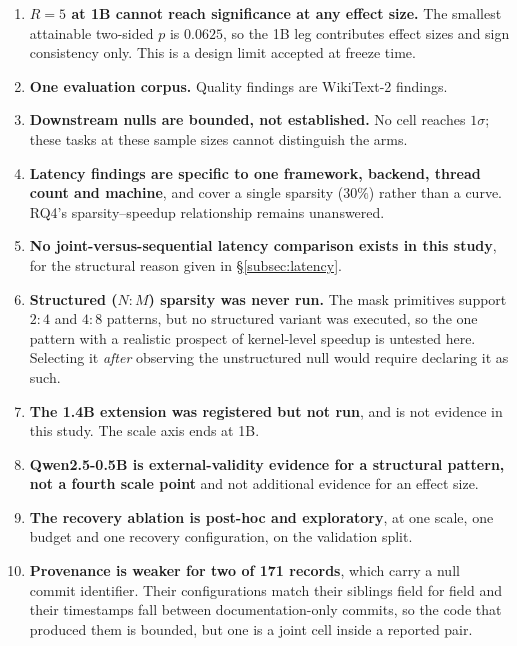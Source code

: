 \begin{enumerate}
        by up to the order margin measured on validation ($\sim\!\SI{0.18}{pp}$ at 160M/W8),
        which exceeds the W8 gains themselves. No W8 conclusion should rest on sign alone.
  \item \textbf{$R = 5$ at 1B cannot reach significance at any effect size.} The smallest
        attainable two-sided $p$ is $0.0625$, so the 1B leg contributes effect sizes and sign
        consistency only. This is a design limit accepted at freeze time.
  \item \textbf{One evaluation corpus.} Quality findings are WikiText-2 findings.
  \item \textbf{Downstream nulls are bounded, not established.} No cell reaches $1\sigma$;
        these tasks at these sample sizes cannot distinguish the arms.
  \item \textbf{Latency findings are specific to one framework, backend, thread count and
        machine}, and cover a single sparsity ($30\%$) rather than a curve. RQ4's
        sparsity--speedup relationship remains unanswered.
  \item \textbf{No joint-versus-sequential latency comparison exists in this study}, for the
        structural reason given in \S\ref{subsec:latency}.
  \item \textbf{Structured ($N{:}M$) sparsity was never run.} The mask primitives support
        $2{:}4$ and $4{:}8$ patterns, but no structured variant was executed, so the one
        pattern with a realistic prospect of kernel-level speedup is untested here. Selecting
        it \emph{after} observing the unstructured null would require declaring it as such.
  \item \textbf{The 1.4B extension was registered but not run}, and is not evidence in this
        study. The scale axis ends at 1B.
  \item \textbf{Qwen2.5-0.5B is external-validity evidence for a structural pattern, not a
        fourth scale point} and not additional evidence for an effect size.
  \item \textbf{The recovery ablation is post-hoc and exploratory}, at one scale, one budget
        and one recovery configuration, on the validation split.
  \item \textbf{Provenance is weaker for two of 171 records}, which carry a null commit
        identifier. Their configurations match their siblings field for field and their
        timestamps fall between documentation-only commits, so the code that produced them is
        bounded, but one is a joint cell inside a reported pair.
\end{enumerate}

